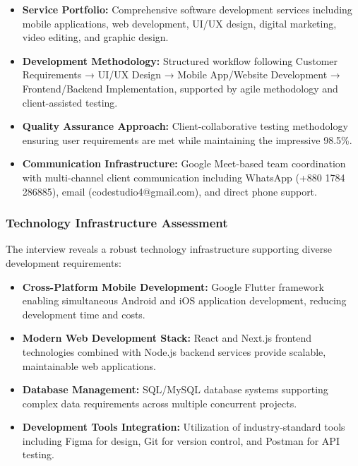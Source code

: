\documentclass[12pt,a4paper]{article}
\begin{document}
\begin{itemize}
    \item \textbf{Service Portfolio:} Comprehensive software development services including mobile applications, web development, UI/UX design, digital marketing, video editing, and graphic design.
    
    \item \textbf{Development Methodology:} Structured workflow following Customer Requirements → UI/UX Design → Mobile App/Website Development → Frontend/Backend Implementation, supported by agile methodology and client-assisted testing.
    
    \item \textbf{Quality Assurance Approach:} Client-collaborative testing methodology ensuring user requirements are met while maintaining the impressive 98.5\%.
    
    \item \textbf{Communication Infrastructure:} Google Meet-based team coordination with multi-channel client communication including WhatsApp (+880 1784 286885), email (codestudio4@gmail.com), and direct phone support.
\end{itemize}

\subsubsection{Technology Infrastructure Assessment}

The interview reveals a robust technology infrastructure supporting diverse development requirements:

\begin{itemize}
    \item \textbf{Cross-Platform Mobile Development:} Google Flutter framework enabling simultaneous Android and iOS application development, reducing development time and costs.
    
    \item \textbf{Modern Web Development Stack:} React and Next.js frontend technologies combined with Node.js backend services provide scalable, maintainable web applications.
    
    \item \textbf{Database Management:} SQL/MySQL database systems supporting complex data requirements across multiple concurrent projects.
    
    \item \textbf{Development Tools Integration:} Utilization of industry-standard tools including Figma for design, Git for version control, and Postman for API testing.
\end{itemize}
\end{document}
